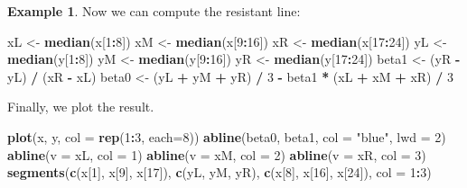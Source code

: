 \documentclass[
  a4paper,
]{article}
\newenvironment{Shaded}{\begin{snugshade}}{\end{snugshade}}
\newcommand{\AttributeTok}[1]{\textcolor[rgb]{0.13,0.29,0.53}{#1}}
\newcommand{\DecValTok}[1]{\textcolor[rgb]{0.00,0.00,0.81}{#1}}
\newcommand{\FunctionTok}[1]{\textcolor[rgb]{0.13,0.29,0.53}{\textbf{#1}}}
\newcommand{\NormalTok}[1]{#1}
\newcommand{\OtherTok}[1]{\textcolor[rgb]{0.56,0.35,0.01}{#1}}
\newcommand{\SpecialCharTok}[1]{\textcolor[rgb]{0.81,0.36,0.00}{\textbf{#1}}}
\newcommand{\StringTok}[1]{\textcolor[rgb]{0.31,0.60,0.02}{#1}}
\theoremstyle{definition}
\theoremstyle{definition}
\newtheorem{example}{Example}[section]
\theoremstyle{definition}
\theoremstyle{definition}
\theoremstyle{remark}
\begin{document}
\begin{example}
Now we can compute the resistant line:

\begin{Shaded}
\begin{Highlighting}[]
\NormalTok{xL }\OtherTok{\textless{}{-}} \FunctionTok{median}\NormalTok{(x[}\DecValTok{1}\SpecialCharTok{:}\DecValTok{8}\NormalTok{])}
\NormalTok{xM }\OtherTok{\textless{}{-}} \FunctionTok{median}\NormalTok{(x[}\DecValTok{9}\SpecialCharTok{:}\DecValTok{16}\NormalTok{])}
\NormalTok{xR }\OtherTok{\textless{}{-}} \FunctionTok{median}\NormalTok{(x[}\DecValTok{17}\SpecialCharTok{:}\DecValTok{24}\NormalTok{])}
\NormalTok{yL }\OtherTok{\textless{}{-}} \FunctionTok{median}\NormalTok{(y[}\DecValTok{1}\SpecialCharTok{:}\DecValTok{8}\NormalTok{])}
\NormalTok{yM }\OtherTok{\textless{}{-}} \FunctionTok{median}\NormalTok{(y[}\DecValTok{9}\SpecialCharTok{:}\DecValTok{16}\NormalTok{])}
\NormalTok{yR }\OtherTok{\textless{}{-}} \FunctionTok{median}\NormalTok{(y[}\DecValTok{17}\SpecialCharTok{:}\DecValTok{24}\NormalTok{])}
\NormalTok{beta1 }\OtherTok{\textless{}{-}}\NormalTok{ (yR }\SpecialCharTok{{-}}\NormalTok{ yL) }\SpecialCharTok{/}\NormalTok{ (xR }\SpecialCharTok{{-}}\NormalTok{ xL)}
\NormalTok{beta0 }\OtherTok{\textless{}{-}}\NormalTok{ (yL }\SpecialCharTok{+}\NormalTok{ yM }\SpecialCharTok{+}\NormalTok{ yR) }\SpecialCharTok{/} \DecValTok{3} \SpecialCharTok{{-}}\NormalTok{ beta1 }\SpecialCharTok{*}\NormalTok{ (xL }\SpecialCharTok{+}\NormalTok{ xM }\SpecialCharTok{+}\NormalTok{ xR) }\SpecialCharTok{/} \DecValTok{3}
\end{Highlighting}
\end{Shaded}

Finally, we plot the result.

\begin{Shaded}
\begin{Highlighting}[]
\FunctionTok{plot}\NormalTok{(x, y, }\AttributeTok{col =} \FunctionTok{rep}\NormalTok{(}\DecValTok{1}\SpecialCharTok{:}\DecValTok{3}\NormalTok{, }\AttributeTok{each=}\DecValTok{8}\NormalTok{))}
\FunctionTok{abline}\NormalTok{(beta0, beta1, }\AttributeTok{col =} \StringTok{"blue"}\NormalTok{, }\AttributeTok{lwd =} \DecValTok{2}\NormalTok{)}
\FunctionTok{abline}\NormalTok{(}\AttributeTok{v =}\NormalTok{ xL, }\AttributeTok{col =} \DecValTok{1}\NormalTok{)}
\FunctionTok{abline}\NormalTok{(}\AttributeTok{v =}\NormalTok{ xM, }\AttributeTok{col =} \DecValTok{2}\NormalTok{)}
\FunctionTok{abline}\NormalTok{(}\AttributeTok{v =}\NormalTok{ xR, }\AttributeTok{col =} \DecValTok{3}\NormalTok{)}
\FunctionTok{segments}\NormalTok{(}\FunctionTok{c}\NormalTok{(x[}\DecValTok{1}\NormalTok{], x[}\DecValTok{9}\NormalTok{], x[}\DecValTok{17}\NormalTok{]), }\FunctionTok{c}\NormalTok{(yL, yM, yR), }\FunctionTok{c}\NormalTok{(x[}\DecValTok{8}\NormalTok{], x[}\DecValTok{16}\NormalTok{], x[}\DecValTok{24}\NormalTok{]),}
         \AttributeTok{col =} \DecValTok{1}\SpecialCharTok{:}\DecValTok{3}\NormalTok{)}
\end{Highlighting}
\end{Shaded}


\end{example}
\end{document}
